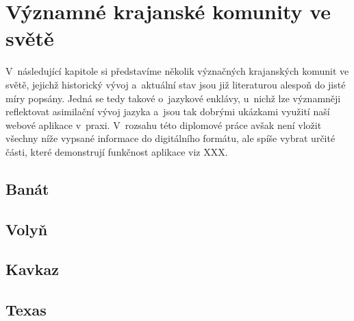 \hypertarget{vuxfdznamnuxe9-krajanskuxe9-komunity-ve-svux11btux11b}{%
\chapter{Významné krajanské komunity ve světě}\label{vuxfdznamnuxe9-krajanskuxe9-komunity-ve-svux11btux11b}}

V~následující kapitole si představíme několik význačných krajanských komunit ve světě, jejichž historický vývoj a~aktuální stav jsou již literaturou alespoň do jisté míry popsány. Jedná se tedy takové o~jazykové enklávy, u~nichž lze významněji reflektovat asimilační vývoj jazyka a~jsou tak dobrými ukázkami využití naší webové aplikace v~praxi. V~rozsahu této diplomové práce avšak není vložit všechny níže vypsané informace do digitálního formátu, ale spíše vybrat určité části, které demonstrují funkčnost aplikace viz XXX.

\hypertarget{banuxe1t}{%
\section{Banát}\label{banuxe1t}}

\hypertarget{volyux148}{%
\section{Volyň}\label{volyux148}}

\hypertarget{kavkaz}{%
\section{Kavkaz}\label{kavkaz}}

\hypertarget{texas}{%
\section{Texas}\label{texas}}
